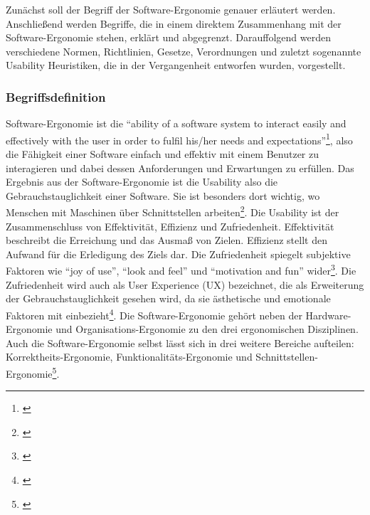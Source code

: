 Zunächst soll der Begriff der Software-Ergonomie genauer erläutert werden. Anschließend werden Begriffe, die in einem direktem Zusammenhang mit der Software-Ergonomie stehen, erklärt und abgegrenzt. Darauffolgend werden verschiedene Normen, Richtlinien, Gesetze, Verordnungen und zuletzt sogenannte Usability Heuristiken, die in der Vergangenheit entworfen wurden, vorgestellt.


\subsubsection{Begriffsdefinition}
Software-Ergonomie ist die \enquote{ability of a software system to interact easily and effectively with the user in order to fulfil his/her needs and expectations}\footnote{\cite[4]{Oppermann1988einfuehrung}}, also die Fähigkeit einer Software einfach und effektiv mit einem Benutzer zu interagieren und dabei dessen Anforderungen und Erwartungen zu erfüllen. Das Ergebnis aus der Software-Ergonomie ist die Usability also die Gebrauchstauglichkeit einer Software. Sie ist besonders dort wichtig, wo Menschen mit Maschinen über Schnittstellen arbeiten\footnote{\cite[vgl.][]{usabilityDe}}. Die Usability ist der Zusammenschluss von Effektivität, Effizienz und Zufriedenheit. Effektivität beschreibt die Erreichung und das Ausmaß von Zielen. Effizienz stellt den Aufwand für die Erledigung des Ziels dar. Die Zufriedenheit spiegelt subjektive Faktoren wie \enquote{joy of use}, \enquote{look and feel} und \enquote{motivation and fun} wider\footnote{\cite[vgl.][]{Holzinger2011human}}. Die Zufriedenheit wird auch als User Experience (UX) bezeichnet, die als Erweiterung der Gebrauchstauglichkeit gesehen wird, da sie ästhetische und emotionale Faktoren mit einbezieht\footnote{\cite[vgl.][]{usabilityDe}}. Die Software-Ergonomie gehört neben der Hardware-Ergonomie und Organisations-Ergonomie zu den drei ergonomischen Disziplinen. Auch die Software-Ergonomie selbst lässt sich in drei weitere Bereiche aufteilen: Korrektheits-Ergonomie, Funktionalitäts-Ergonomie und Schnittstellen-Ergonomie\footnote{\cite[vgl.][]{Oppermann1988einfuehrung}}.


